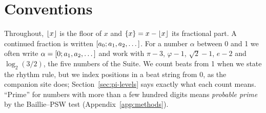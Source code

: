 \section{Conventions}

Throughout, $\left\lfloor x\right\rfloor$ is the floor of $x$ and $\{x\} = x - \left\lfloor x\right\rfloor$ its fractional part. A continued fraction is written $[a_0; a_1, a_2, \dots]$. For a number $\alpha$ between 0 and 1 we often write $\alpha = [0; a_1, a_2, \dots]$ and work with $\pi - 3$, $\varphi - 1$, $\sqrt2 - 1$, $e - 2$ and $\log_2(3/2)$, the five numbers of the Suite. We count beats from 1 when we state the rhythm rule, but we index positions in a beat string from 0, as the companion site does; Section~\ref{sec:pi-levels} says exactly what each count means. ``Prime'' for numbers with more than a few hundred digits means \emph{probable prime} by the Baillie--PSW test (Appendix~\ref{app:methods}).

